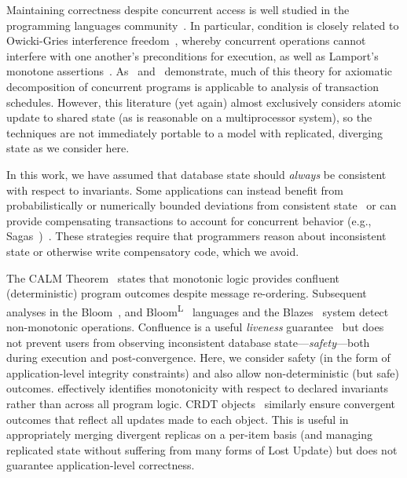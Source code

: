  Maintaining correctness despite concurrent
access is well studied in the programming languages
community~\cite{schneider-concurrent}. In particular, \iconfluence
condition is closely related to Owicki-Gries interference
freedom~\cite{owickigries}, whereby concurrent operations cannot
interfere with one another's preconditions for execution, as well as
Lamport's monotone
assertions~\cite{schneider-concurrent}. As~\cite{agarwal-consistency}
and~\cite{decomp-semantics} demonstrate, much of this theory for
axiomatic decomposition of concurrent programs is applicable to
analysis of transaction schedules. However, this literature (yet
again) almost exclusively considers atomic update to shared state (as
is reasonable on a multiprocessor system), so the techniques are not
immediately portable to a model with replicated, diverging state as we
consider here.

 In this work, we have assumed that
database state should \textit{always} be consistent with respect to
invariants. Some applications can instead benefit from
probabilistically or numerically bounded deviations from consistent
state~\cite{epsilon-divergence} or can provide compensating
transactions to account for concurrent behavior (e.g.,
Sagas~\cite{sagas})~\cite{ic-survey,ic-survey-two}. These strategies
require that programmers reason about inconsistent state or otherwise
write compensatory code, which we avoid.

 The CALM
Theorem~\cite{ameloot-calm} states that monotonic logic provides
confluent (deterministic) program outcomes despite message
re-ordering. Subsequent analyses in the Bloom~\cite{calm}, and
Bloom\textsuperscript{L}~\cite{blooml} languages and the
Blazes~\cite{blazes} system detect non-monotonic
operations. Confluence is a useful \textit{liveness}
guarantee~\cite{schneider-concurrent} but does not prevent users from
observing inconsistent database state---\textit{safety}---both during
execution and post-convergence. Here, we consider safety (in the form
of application-level integrity constraints) and also allow
non-deterministic (but safe) outcomes. \iconfluence effectively
identifies monotonicity with respect to declared invariants rather
than across all program logic. CRDT objects~\cite{crdt} similarly
ensure convergent outcomes that reflect all updates made to each
object. This is useful in appropriately merging divergent replicas on
a per-item basis (and managing replicated state without suffering from
many forms of Lost Update) but does not guarantee application-level
correctness.

